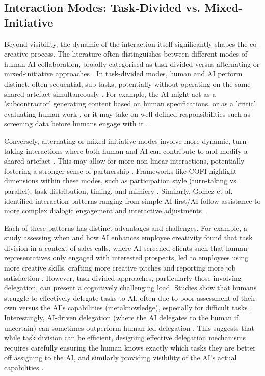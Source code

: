 \subsection{Interaction Modes: Task-Divided vs. Mixed-Initiative}

Beyond visibility, the dynamic of the interaction itself significantly shapes the co-creative process. The literature often distinguishes between different modes of human-AI collaboration, broadly categorised as task-divided versus alternating or mixed-initiative approaches \citep{Kantosalo2020-nh, Kantosalo2016-nm}. In task-divided modes, human and AI perform distinct, often sequential, sub-tasks, potentially without operating on the same shared artefact simultaneously \citep{Kantosalo2016-nm}. For example, the AI might act as a 'subcontractor' generating content based on human specifications, or as a 'critic' evaluating human work \citep{Lin2023-zq}, or it may take on well defined responsibilities such as screening data before humans engage with it \citep{Jia2024-vp}. 

Conversely, alternating or mixed-initiative modes involve more dynamic, turn-taking interactions where both human and AI can contribute to and modify a shared artefact \citep{Kantosalo2020-nh, Kantosalo2016-nm, Lin2023-zq}. This may allow for more non-linear interactions, potentially fostering a stronger sense of partnership \citep{Davis2016-te, Zhou2024-vp}. Frameworks like COFI highlight dimensions within these modes, such as participation style (turn-taking vs. parallel), task distribution, timing, and mimicry \citep{Rezwana2022-gg}. Similarly, Gomez et al. identified interaction patterns ranging from simple AI-first/AI-follow assistance to more complex dialogic engagement and interactive adjustments \citep{Gomez2023-bp}.

Each of these patterns has distinct advantages and challenges. For example, a study assessing when and how AI enhances employee creativity found that task division in a context of sales calls, where AI screened clients such that human representatives only engaged with interested prospects, led to employees using more creative skills, crafting more creative pitches and reporting more job satisfaction \citep{Jia2024-vp}. However, task-divided approaches, particularly those involving delegation, can present a cognitively challenging load. Studies show that humans struggle to effectively delegate tasks to AI, often due to poor assessment of their own versus the AI's capabilities (metaknowledge), especially for difficult tasks \citep{Fugener2019-yz}. Interestingly, AI-driven delegation (where the AI delegates to the human if uncertain) can sometimes outperform human-led delegation \citep{Fugener2019-yz}. This suggests that while task division can be efficient, designing effective delegation mechanisms requires carefully ensuring the human knows exactly which tasks they are better off assigning to the AI, and similarly providing visibility of the AI's actual capabilities \citep{DellAcqua2022-dy, Fugener2019-yz}.

